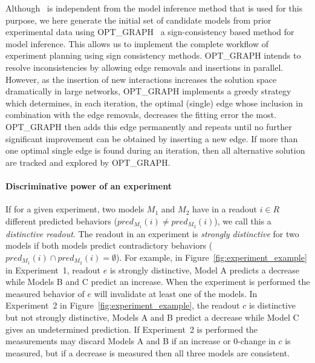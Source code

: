 Although \expidesi\ is independent from the model inference method that is used for this purpose,
 we here generate the initial set of candidate models from prior experimental data using OPT\_GRAPH~\cite{samaga13a} a sign-consistency based method for model inference.
 This allows us to implement the complete workflow of experiment planning using sign consistency methods.
OPT\_GRAPH
intends to resolve inconsistencies by allowing edge removals and insertions in parallel.
However, as the insertion of new interactions increases the solution space
dramatically in large networks,
OPT\_GRAPH implements a greedy strategy which determines, in each iteration,
the optimal (single) edge whose inclusion in combination with the edge removals,
decreases the fitting error the most.
OPT\_GRAPH then adds this edge permanently and repeats until no further
significant improvement can be obtained by inserting a new edge.
If more than one optimal single edge is found during an iteration, then all alternative solution are tracked and explored by OPT\_GRAPH.


\paragraph*{\bf Discriminative power of an experiment}

If for a given experiment,
two models $M_1$ and $M_2$ have in a readout $i \in R$
different predicted behaviors ($pred_{M_1}(i) \neq pred_{M_2}(i)$),
 we call this a \emph{distinctive readout}.
The readout in an experiment is \emph{strongly distinctive} for two models
if both models predict contradictory behaviors ($pred_{M_1}(i) \cap pred_{M_2}(i) = \emptyset$).
For example, in Figure~\ref{fig:experiment_example} in Experiment~1,
readout $e$ is strongly distinctive, Model A  predicts a decrease
while Models B and C predict an increase.
When the experiment is performed the measured behavior of $e$ will
 invalidate at least one of the models.
In Experiment~2 in Figure~\ref{fig:experiment_example}, the readout $c$ is distinctive
but not strongly distinctive, Models A and B predict a decrease while Model C gives an undetermined prediction.
If Experiment~2 is performed the measurements may discard Models A and B if an
increase or 0-change in $c$ is measured, but if a decrease is measured then
all three models are consistent.

